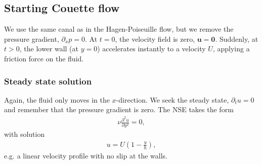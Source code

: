 \documentclass[a4paper,10pt]{article}
\renewcommand{\vec}[1]{\mathbf{#1}}
\renewcommand{\(}{\left(}
\renewcommand{\)}{\right)}
\newcommand{\dpartt}[2]{\frac{\partial^2#1}{\partial#2^2}}
\begin{document}
\subsection{Starting Couette flow}
\label{sec:couette}
We use the same canal as in the Hagen-Poiseuille flow, but we remove the pressure gradient, $\partial_x p=0$. At $t=0$, the velocity field is zero, $\vec u = \vec 0$. Suddenly, at $t>0$, the lower wall (at $y=0$) accelerates instantly to a velocity $U$, applying a friction force on the fluid.
\subsubsection{Steady state solution}
Again, the fluid only moves in the $x$-direction. We seek the steady state, $\partial_t u=0$ and remember that the pressure gradient is zero. The NSE takes the form
\begin{align*}
  \nu\dpartt{u}{y} = 0,
\end{align*}
with solution
\begin{align}
  \label{eq:couette_stationary}
  u = U\left(1 - \frac{y}{h}\right),
\end{align}
e.g. a linear velocity profile with no slip at the walls.
\end{document}
